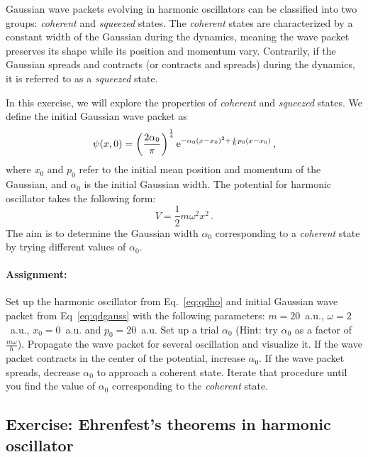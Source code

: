 Gaussian wave packets evolving in harmonic oscillators can be classified into two groups: \textit{coherent} and \textit{squeezed} states. The \textit{coherent} states are characterized by a constant width of the Gaussian during the dynamics, meaning the wave packet preserves its shape while its position and momentum vary. Contrarily, if the Gaussian spreads and contracts (or contracts and spreads) during the dynamics, it is referred to as a \textit{squeezed} state.

In this exercise, we will explore the properties of \textit{coherent} and \textit{squeezed} states. We define the initial Gaussian wave packet as
\begin{equation}
    \psi(x,0) = \left(\frac{2\alpha_0}{\pi}\right)^{\frac{1}{4}} \mathrm{e}^{-\alpha_0(x-x_0)^2 +\frac{i}{\hbar}p_0(x-x_0)} \, ,
    \label{eq:qdgauss}
\end{equation}
where $x_0$ and $p_0$ refer to the initial mean position and momentum of the Gaussian, and $\alpha_0$ is the initial Gaussian width. The potential for harmonic oscillator takes the following form:
\begin{equation}
    V = \frac{1}{2}m\omega^2x^2 \, .
    \label{eq:qdho}
\end{equation}
The aim is to determine the Gaussian width $\alpha_0$ corresponding to a \textit{coherent} state by trying different values of $\alpha_0$.

\paragraph{Assignment:} Set up the harmonic oscillator from Eq.~\eqref{eq:qdho} and initial Gaussian wave packet from Eq~\eqref{eq:qdgauss} with the following parameters: $m=20$~a.u., $\omega=2$~a.u., $x_0=0$~a.u. and $p_0=20$~a.u. Set up a trial $\alpha_0$ (Hint: try $\alpha_0$ as a factor of $\frac{m\omega}{\hbar}$). Propagate the wave packet for several oscillation and visualize it. If the wave packet contracts in the center of the potential, increase $\alpha_0$. If the wave packet spreads, decrease $\alpha_0$ to approach a coherent state. Iterate that procedure until you find the value of $\alpha_0$ corresponding to the \textit{coherent} state. 

\subsection*{Exercise: Ehrenfest's theorems in harmonic oscillator}

